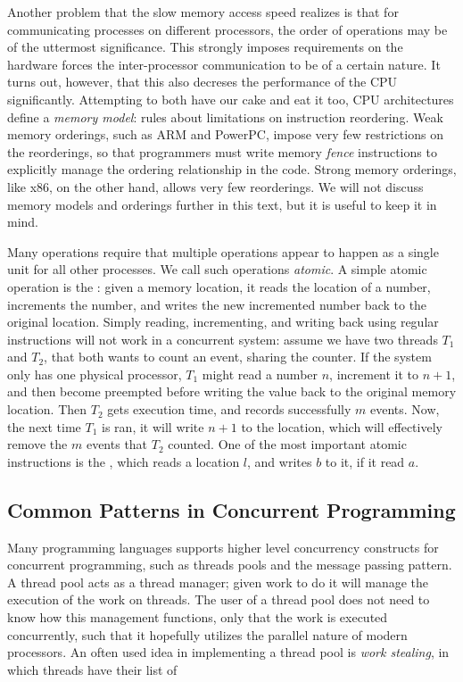 Another problem that the slow memory access speed realizes is that for communicating processes on
different processors, the order of operations may be of the uttermost significance. This strongly
imposes requirements on the hardware forces the inter-processor communication to be of a certain
nature. It turns out, however, that this also decreses the performance of the CPU significantly.
Attempting to both have our cake and eat it too, CPU architectures define a \emph{memory model}:
rules about limitations on instruction reordering. Weak memory orderings, such as ARM and PowerPC,
impose very few restrictions on the reorderings, so that programmers must write memory \emph{fence}
instructions to explicitly manage the ordering relationship in the code. Strong memory orderings,
like x86, on the other hand, allows very few reorderings. We will not discuss memory models and
orderings further in this text, but it is useful to keep it in mind.

Many operations require that multiple operations appear to happen as a single unit for all other
processes. We call such operations \emph{atomic}. A simple atomic operation is the
: given a memory location, it reads the location of a number, increments the
number, and writes the new incremented number back to the original location.  Simply reading,
incrementing, and writing back using regular instructions will not work in a concurrent system:
assume we have two threads $T_1$ and $T_2$, that both wants to count an event, sharing the counter.
If the system only has one physical processor, $T_1$ might read a number $n$, increment it to
$n+1$, and then become preempted before writing the value back to the original memory location.
Then $T_2$ gets execution time, and records successfully $m$ events. Now, the next time $T_1$ is
ran, it will write $n+1$ to the location, which will effectively remove the $m$ events that $T_2$
counted. One of the most important atomic instructions is the ,
which reads a location $l$, and writes $b$ to it, if it read $a$.

\subsection{Common Patterns in Concurrent Programming\label{sec:common-patterns}}

Many programming languages supports higher level concurrency constructs for concurrent programming,
such as threads pools and the message passing pattern. A thread pool acts as a thread manager;
given work to do it will manage the execution of the work on threads. The user of a thread pool
does not need to know how this management functions, only that the work is executed concurrently,
such that it hopefully utilizes the parallel nature of modern processors.  An often used idea in
implementing a thread pool is \emph{work stealing}, in which threads have their list of

